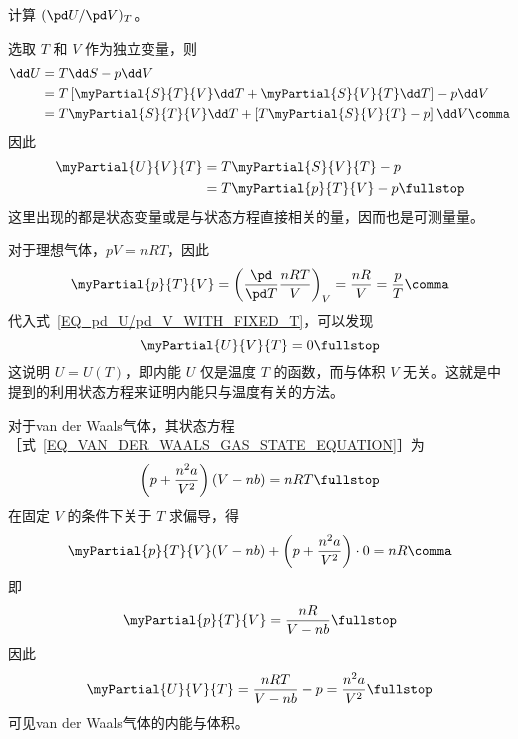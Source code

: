 		\begin{myExample} \label{EG_pd_U/pd_V_WITH_FIXED_T}
			计算 $(\pd U/ \pd V)_T$。
			
			选取 $T$ 和 $V$ 作为独立变量，则
			\begin{align}
				\dd U &= T \dd S - p \dd V \notag \\
				&= T \left[ \myPartial{S}{T}{V} \dd T + \myPartial{S}{V}{T} \dd T \right] - p \dd V \notag \\
				&= T \myPartial{S}{T}{V} \dd T + \left[ T \myPartial{S}{V}{T} - p \right] \dd V \comma
			\end{align}
			因此
			\begin{align}
				\myPartial{U}{V}{T} &= T \myPartial{S}{V}{T} - p \notag \\
				&= T \myPartial{p}{T}{V} - p \fullstop \label{EQ_pd_U/pd_V_WITH_FIXED_T}
			\end{align}
			这里出现的都是状态变量或是与状态方程直接相关的量，因而也是可测量量。
			
			对于理想气体，$p V = n R T$，因此
			\begin{equation}
				\myPartial{p}{T}{V} = \left( \frac{\pd}{\pd T} \frac{n R T}{V} \right)_V = \frac{n R}{V} = \frac{p}{T} \comma
			\end{equation}
			代入式~\eqref{EQ_pd_U/pd_V_WITH_FIXED_T}，可以发现
			\begin{equation}
				\myPartial{U}{V}{T} = 0 \fullstop
			\end{equation}
			这说明 $U = U(T)$，即内能 $U$ 仅是温度 $T$ 的函数，而与体积 $V$ 无关。这就是中提到的利用状态方程来证明内能只与温度有关的方法。
			
			对于van der Waals气体，其状态方程 ［式~\eqref{EQ_VAN_DER_WAALS_GAS_STATE_EQUATION}］为
			\begin{equation}
				\left( p + \frac{n^2 a}{V^2} \right) (V - n b) = n R T \fullstop
			\end{equation}
			在固定 $V$ 的条件下关于 $T$ 求偏导，得
			\begin{equation}
				\myPartial{p}{T}{V} (V - n b) + \left( p + \frac{n^2 a}{V^2} \right) \cdot 0 = n R \comma
			\end{equation}
			即
			\begin{equation}
				\myPartial{p}{T}{V} = \frac{n R}{V - n b} \fullstop
			\end{equation}
			因此
			\begin{equation}
				\myPartial{U}{V}{T} = \frac{n R T}{V - n b} - p = \frac{n^2 a}{V^2} \fullstop
			\end{equation}
			可见van der Waals气体的内能与体积。%
		\end{myExample}
		
